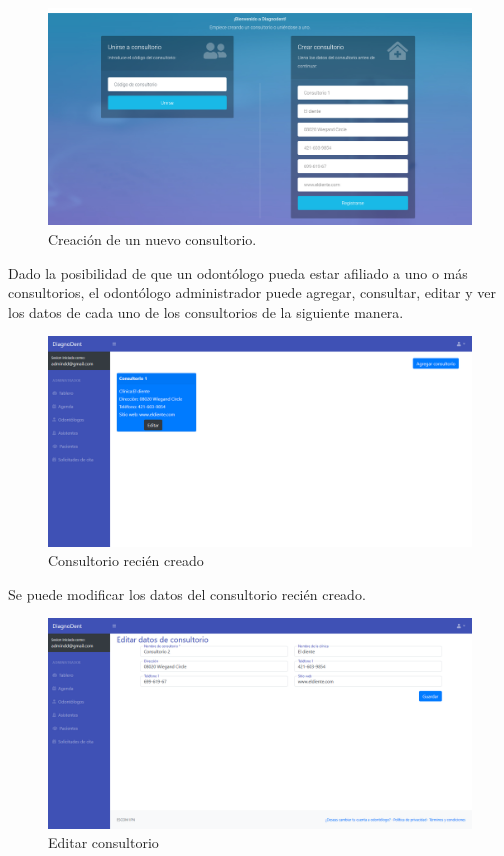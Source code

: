 \begin{figure}[H]
\centering
\includegraphics[width=17cm,keepaspectratio]{pictures/adminodo/login/inicio-crear-consultorio-22.png}
\caption{Creación de un nuevo consultorio.}
\end{figure}

Dado la posibilidad de que un odontólogo pueda estar afiliado a uno o más consultorios, el odontólogo administrador puede agregar, consultar, editar y ver los datos de cada uno de los consultorios de la siguiente manera.

\begin{figure}[H]
\centering
\includegraphics[width=17cm,keepaspectratio]{pictures/adminodo/login/consultorio-1.png}
\caption{Consultorio recién creado}
\end{figure}

Se puede modificar los datos del consultorio recién creado.

\begin{figure}[H]
\centering
\includegraphics[width=17cm,keepaspectratio]{pictures/adminodo/login/editar-consultorio.png}
\caption{Editar consultorio}
\end{figure}

